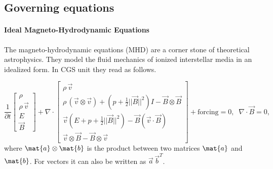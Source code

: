 \subsection{Governing equations}
\label{sec:governing-equations}

\paragraph{Ideal Magneto-Hydrodynamic Equations}
The magneto-hydrodynamic equations (MHD) are a corner stone of theoretical
astrophysics.  They model the fluid mechanics of ionized interstellar media in
an idealized form. In CGS unit they read as follows.


\begin{equation*}
    \frac{1}{\partial t} \left[ \begin{array}{c}
        \rho \\
        \rho\,\vec{v} \\
        E \\
        \vec{B}
    \end{array} \right] +
    \nabla \cdot \left[ \begin{array}{c}
        \rho\,\vec{v}\\
        \rho\,(\vec{v}\otimes\vec{v}) + (p + \frac{1}{2} ||\vec{B}||^2)I - \vec{B} \otimes \vec{B} \\
        \vec{v}(E + p + \frac{1}{2} ||\vec{B}||^2) - \vec{B} (\vec{v}\cdot\vec{B}) \\
        \vec{v} \otimes \vec{B} - \vec{B} \otimes \vec{v}
    \end{array} \right] + \text{forcing} = 0, \;\; \nabla \cdot \vec{B} = 0,
\end{equation*}
where $\mat{a} \otimes \mat{b}$ is the  product between two
matrices $\mat{a}$ and $\mat{b}$. For vectors it can also be written as
$\vec{a}\,\vec{b}^T$.

